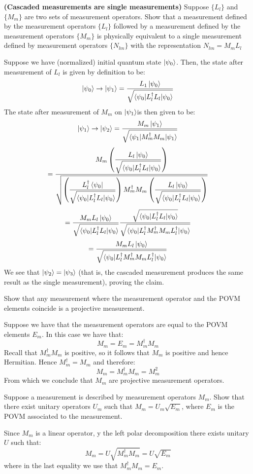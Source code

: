 \begin{example}
    \textbf{(Cascaded measurements are single measurements)} Suppose $\{L_l\}$ and $\{M_m\}$ are two sets of measurement operators. Show that a measurement defined by the measurement operators $\{L_l\}$ followed by a measurement defined by the measurement operators $\{M_m\}$ is physically equivalent to a single measurement defined by measurement operators $\{N_{lm}\}$ with the representation $N_{lm}=M_mL_l$

    Suppose we have (normalized) initial quantum state $\ket{\psi_0}$. Then, the state after measurement of $L_l$ is given by definition to be:
    \[
    \ket{\psi_0}\rightarrow \ket{\psi_1}=\frac{L_1\ket{\psi_0}}{\sqrt{\braket{\psi_0|L_l^{\dagger}L_l|\psi_0}}}
    \]
    The state after measurement of $M_m$ on $\ket{\psi_1}$is then given to be:
    \[
    \ket{\psi_1} \rightarrow \ket{\psi_2} = \frac{M_m\ket{\psi_1}}{\sqrt{\braket{\psi_1|M_m^{\dagger}M_m|\psi_1}}}
    \]
    \[
    =\dfrac{M_m\left(\dfrac{L_l\ket{\psi_0}}{\sqrt{\braket{\psi_0|L_l^{\dagger}L_l|\psi_0}}}\right)}{\sqrt{\left(\dfrac{L_l^{\dagger}\bra{\psi_0}}{\sqrt{\braket{\psi_0|L_l^{\dagger}L_l|\psi_0}}}\right) M_m^{\dagger}M_m\left(\dfrac{L_l\ket{\psi_0}}{\sqrt{\braket{\psi_0|L_l^{\dagger}L_l|\psi_0}}}\right)}}
    \]
    \[
    =\dfrac{M_mL_l\ket{\psi_0}}{\sqrt{\braket{\psi_0|L_l^{\dagger}L_l|\psi_0}}}\dfrac{\sqrt{\braket{\psi_0|L_l^{\dagger}L_l|\psi_0}}}{\sqrt{\braket{\psi_0|L_l^{\dagger}M_m^{\dagger}M_mL_l^{\dagger}|\psi_0}}}
    \]
    \[
    =\dfrac{M_mL_l\ket{\psi_0}}{\sqrt{\braket{\psi_0|L_l^{\dagger}M_m^{\dagger}M_mL_l^{\dagger}|\psi_0}}}
    \]
    We see that $\ket{\psi_2}=\ket{\psi_3}$ (that is, the cascaded measurement produces the same result as the single measurement), proving the claim.
\end{example}
\begin{example}
    Show that any measurement where the measurement operator and the POVM elements coincide is a projective measurement.

    Suppose we have that the measurement operators are equal to the POVM elements $E_m$. In this case we have that:
    \[
    M_m=E_m=M_m^{\dagger}M_m
    \]
    Recall that $M_m^{\dagger}M_m$ is positive, so it follows that $M_m$ is positive and hence Hermitian. Hence $M_m^{\dagger}=M_m$ and therefore:
    \[
    M_m = M_m^{\dagger}M_m=M_m^2
    \]
    From which we conclude that $M_m$ are projective measurement operators.
\end{example}
\begin{example}
    Suppose a measurement is described by measurement operators $M_m$. Show that there exist unitary operators $U_m$ such that $M_m=U_m\sqrt{E_m}$, where $E_m$ is the POVM associated to the measurement.

    Since $M_m$ is a linear operator, y the left polar decomposition there exists unitary $U$ such that:
    \[
    M_m=U\sqrt{M_m^{\dagger}M_m} = U\sqrt{E_m}
    \]
    where in the last equality we use that $M_m^{\dagger}M_m=E_m$.
\end{example}
